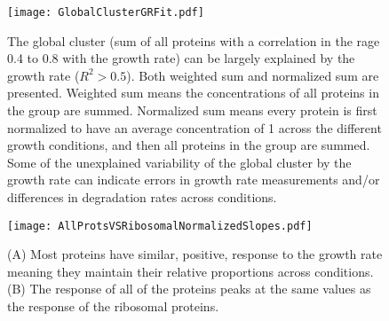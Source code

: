 \documentclass[notitlepage]{article}
\begin{document}
\begin{figure}[h]
\centering
\texttt{[image: GlobalClusterGRFit.pdf]}
\caption{
The global cluster (sum of all proteins with a correlation in the rage 0.4 to 0.8 with the growth rate) can be largely explained by the growth rate ($R^2>0.5$).
Both weighted sum and normalized sum are presented.
Weighted sum means the concentrations of all proteins in the group are summed.
Normalized sum means every protein is first normalized to have an average concentration of 1 across the different growth conditions, and then all proteins in the group are summed.
Some of the unexplained variability of the global cluster by the growth rate can indicate errors in growth rate measurements and/or differences in degradation rates across conditions.
}
\label{global-grcorr}
\end{figure}

\begin{figure}[h]
\centering
\texttt{[image: AllProtsVSRibosomalNormalizedSlopes.pdf]}
\caption{
    (A) Most proteins have similar, positive, response to the growth rate meaning they maintain their relative proportions across conditions.
    (B) The response of all of the proteins peaks at the same values as the response of the ribosomal proteins.
}
\label{global-fit}
\end{figure}

\begin{comment}
\begin{figure}[h]
\centering
\texttt{[image: CoordinatedRSquareComparison.pdf]}
\caption{
  Proteins in the global cluster fit reasonably well to the global cluster itself
}
\label{global-fit}
\end{figure}

\begin{figure}[h]
\centering
\texttt{[image: GlobalClusterCorr.pdf]}
\caption{
Proteins that have a high correlation (0.4-0.8) with growth rate mostly have even higher correlation to the sum of these proteins (both weighted sum and normalized sum are presented).
Weighted sum means the concentrations of all proteins in the group are summed.
Normalized sum means every protein is first normalized to have an average concentration of 1 across the different growth conditions, and then all proteins in the group are summed.
The higher correlation indicates that their response is coordinated (they scale by the same factor between conditions).
}
\label{global-corr}
\end{figure}

\begin{figure}[h]
\centering
\texttt{[image: GlobalClusterRSquare.pdf]}
\caption{
Plotting the $r^2$ distribution shows that a large fraction of the variability of these proteins is captured by the global response.
}
\label{global-rsq}
\end{figure}

\begin{itemize}
\item This happens in multiple organisms and data sets (show yeast, two data sets of coli). Possibly add mRNA measurements ??.
\end{itemize}
\end{comment}

\printbibliography
\end{document}
